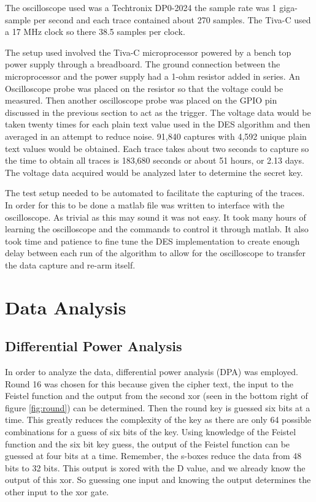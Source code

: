 	The oscilloscope used was a Techtronix DP0-2024 the sample rate was 1 giga-sample per second and each trace contained about 270 samples.  The Tiva-C used a 17 MHz clock so there 38.5 samples per clock.
	
	The setup used involved the Tiva-C microprocessor powered by a bench top power supply through a breadboard.  The ground connection between the microprocessor and the power supply had a 1-ohm resistor added in series.  An Oscilloscope probe was placed on the resistor so that the voltage could be measured.  Then another oscilloscope probe was placed on the GPIO pin discussed in the previous section to act as the trigger.  The voltage data would be taken twenty times for each plain text value used in the DES algorithm and then averaged in an attempt to reduce noise.  91,840 captures with 4,592 unique plain text values would be obtained.  Each trace takes about two seconds to capture so the time to obtain all traces is 183,680 seconds or about 51 hours, or 2.13 days.  The voltage data acquired would be analyzed later to determine the secret key.
	
	The test setup needed to be automated to facilitate the capturing of the traces.  In order for this to be done a matlab file was written to interface with the oscilloscope.  As trivial as this may sound it was not easy.  It took many hours of learning the oscilloscope and the commands to control it through matlab.  It also took time and patience to fine tune the DES implementation to create enough delay between each run of the algorithm to allow for the oscilloscope to transfer the data capture and re-arm itself.
	

\section{Data Analysis}\label{sec::analysis} 
\subsection{Differential Power Analysis}
	In order to analyze the data, differential power analysis (DPA) was employed.  Round 16 was chosen for this because given the cipher text, the input to the Feistel  function and the output from the second xor (seen in the bottom right of figure \ref{fig:round}) can be determined.  Then the round key is guessed six bits at a time.  This greatly reduces the complexity of the key as there are only 64 possible combinations for a guess of six bits of the key.  Using knowledge of the Feistel function and the six bit key guess, the output of the Feistel function can be guessed at four bits at a time.  Remember, the s-boxes reduce the data from 48 bits to 32 bits.  This output is xored with the D value, and we already know the output of this xor.  So guessing one input and knowing the output determines the other input to the xor gate.  
	

